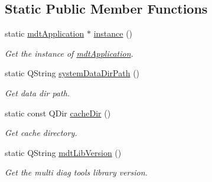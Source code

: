 \subsection*{Static Public Member Functions}
\begin{DoxyCompactItemize}
\item 
static \hyperlink{classmdt_application}{mdt\-Application} $\ast$ \hyperlink{classmdt_application_a365ac79934070b0e5a42d2c7cd9b076d}{instance} ()
\begin{DoxyCompactList}\small\item\em Get the instance of \hyperlink{classmdt_application}{mdt\-Application}. \end{DoxyCompactList}\item 
static Q\-String \hyperlink{classmdt_application_af17bb16e420c91af3d0ad1970714388c}{system\-Data\-Dir\-Path} ()
\begin{DoxyCompactList}\small\item\em Get data dir path. \end{DoxyCompactList}\item 
static const Q\-Dir \hyperlink{classmdt_application_a936beeeb6d56d5d669a478f248d80c7d}{cache\-Dir} ()
\begin{DoxyCompactList}\small\item\em Get cache directory. \end{DoxyCompactList}\item 
static Q\-String \hyperlink{classmdt_application_ad5318086812dad2c2870e294703caa51}{mdt\-Lib\-Version} ()
\begin{DoxyCompactList}\small\item\em Get the multi diag tools library version. \end{DoxyCompactList}\end{DoxyCompactItemize}


